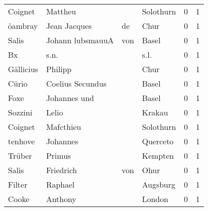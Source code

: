\begin{center}
\begin{tiny}
\begin{longtabu}{llllrr}
                  Coignet &                            Mattheu &             &                                   Solothurn &          0 &         1 \\
                  öambray &                       Jean Jacques &          de &                                        Chur &          0 &         1 \\
                    Salis &                  Johann  lubsmauuA &         von &                                       Basel &          0 &         1 \\
                       Bx &                               s.n. &             &                                        s.l. &          0 &         1 \\
                Gällicius &                            Philipp &             &                                        Chur &          0 &         1 \\
                    Cürio &                   Coelius Secundus &             &                                       Basel &          0 &         1 \\
                     Foxe &                       Johannes und &             &                                       Basel &          0 &         1 \\
                  Sozzini &                              Lelio &             &                                      Krakau &          0 &         1 \\
                  Coignet &                          Mafcthieu &             &                                   Solothurn &          0 &         1 \\
                  tenhove &                           Johannes &             &                                    Querceto &          0 &         1 \\
                   Trüber &                             Primus &             &                                     Kempten &          0 &         1 \\
                    Salis &                          Friedrich &         von &                                        Ohur &          0 &         1 \\
                   Filter &                            Raphael &             &                                    Augsburg &          0 &         1 \\
                    Cooke &                            Anthony &             &                                      London &          0 &         1 \\

\end{longtabu}
\end{tiny}
\end{center}
